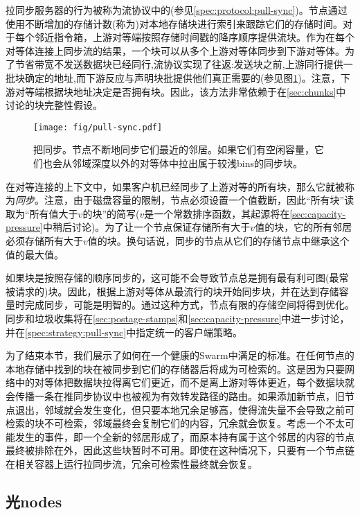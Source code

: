 拉同步服务器的行为被称为流协议中的(参见\ref{spec:protocol:pull-sync})。节点通过使用不断增加的存储计数(称为)对本地存储块进行索引来跟踪它们的存储时间。对于每个邻近指令箱，上游对等端按照存储时间戳的降序顺序提供流块。作为在每个对等体连接上同步流的结果，一个块可以从多个上游对等体同步到下游对等体。为了节省带宽不发送数据块已经同行,流协议实现了往返:发送块之前,上游同行提供一批块确定的地址,而下游反应与声明块批提供他们真正需要的(参见图\ref{fig:pull-syncing})。注意，下游对等端根据块地址决定是否拥有块。因此，该方法非常依赖于在\ref{sec:chunks}中讨论的块完整性假设。


\begin{figure}[htbp]
   \centering
   \texttt{[image: fig/pull-sync.pdf]}
   \caption[把同步\statusgreen]{把同步。节点不断地同步它们最近的邻居。如果它们有空闲容量，它们也会从邻域深度以外的对等体中拉出属于较浅bins的同步块。}
   \label{fig:pull-syncing}
\end{figure}

在对等连接的上下文中，如果客户机已经同步了上游对等的所有块，那么它就被称为\emph{同步}。注意，由于磁盘容量的限制，节点必须设置一个值截断，因此“所有块”读取为“所有值大于$v$的块”的简写($v$是一个常数排序函数，其起源将在\ref{sec:capacity-pressure}中稍后讨论)。为了让一个节点保证存储所有大于$v$值的块，它的所有邻居必须存储所有大于$v$值的块。换句话说，同步的节点从它们的存储节点中继承这个值的最大值。

如果块是按照存储的顺序同步的，这可能不会导致节点总是拥有最有利可图(最常被请求的)块。因此，根据上游对等体从最流行的块开始同步块，并在达到存储容量时完成同步，可能是明智的。通过这种方式，节点有限的存储空间将得到优化。同步和垃圾收集将在\ref{sec:postage-stamps}和\ref{sec:capacity-pressure}中进一步讨论，并在\ref{spec:strategy:pull-sync}中指定统一的客户端策略。

为了结束本节，我们展示了如何在一个健康的Swarm中满足的标准。在任何节点的本地存储中找到的块在被同步到它们的存储器后将成为可检索的。这是因为只要网络中的对等体把数据块拉得离它们更近，而不是离上游对等体更近，每个数据块就会传播一条在推同步协议中也被视为有效转发路径的路由。如果添加新节点，旧节点退出，邻域就会发生变化，但只要本地冗余足够高，使得流失量不会导致之前可检索的块不可检索，邻域最终会复制它们的内容，冗余就会恢复。考虑一个不太可能发生的事件，即一个全新的邻居形成了，而原本持有属于这个邻居的内容的节点最终被排除在外，因此这些块暂时不可用。即使在这种情况下，只要有一个节点链在相关容器上运行拉同步流，冗余可检索性最终就会恢复。

\subsection{光nodes\statusgreen}
\label{sec:light}

